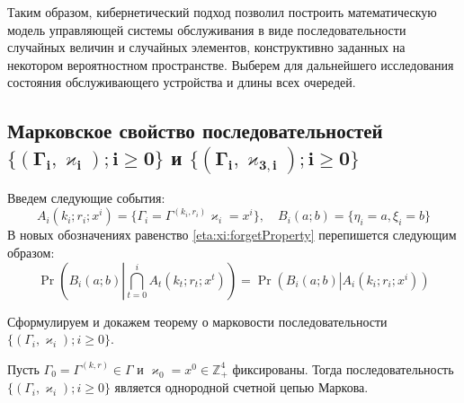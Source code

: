 \documentclass[a4paper,12pt,russian]{extarticle}
\newcommand{\ga}[1]{\Gamma^{\left( #1 \right)} }
\newcommand{\Mark}{\{(\Gamma_i, \varkappa_i); i \geqslant 0\}}
\newcommand{\MarkThree}{\{(\Gamma_i, \varkappa_{3,i}); i \geqslant 0\}}
\begin{document}
Таким образом, кибернетический подход позволил построить математическую модель управляющей системы обслуживания в виде последовательности случайных величин и случайных элементов, конструктивно заданных на некотором вероятностном пространстве. Выберем для дальнейшего исследования состояния обслуживающего устройства и длины всех очередей.

\subsection[Марковское свойство последовательностей $\boldsymbol{\Mark}$ и $\boldsymbol{\MarkThree}$]%
{Марковское свойство последовательностей \\ $\boldsymbol{\Mark}$ и $\boldsymbol{\MarkThree}$}

Введем следующие события:
\begin{equation*}
A_i(k_i;r_i;x^i) = \{\Gamma_i=\ga{k_i,r_i}\varkappa_i=x^i\}, \quad  B_i(a;b) = \{\eta_i=a, \xi_i=b\}
\end{equation*}
В новых обозначениях равенство \eqref{eta:xi:forgetProperty}  перепишется следующим образом:
\begin{equation}
\Pr \left(B_i(a;b) \left| \bigcap_{t=0}^{i} A_t(k_t;r_t;x^t)\right.\right) = \Pr \left(B_i(a;b) \left|  A_i(k_i;r_i;x^i)\right.\right)
\label{new:notation:eta:xi:forget}
\end{equation}

Сформулируем и докажем теорему о марковости последовательности \linebreak$\Mark$.
\begin{theorem}
Пусть $\Gamma_0=\ga{k,r}\in \Gamma$ и $\varkappa_0=x^0\in \mathbb{Z}_+^4$ фиксированы. Тогда последовательность $\Mark$ является однородной счетной цепью Маркова. 
\end{theorem}
\end{document}
